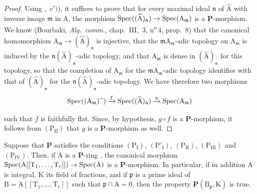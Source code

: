\begin{proof}
Using ,~$c')$), it suffices to prove that for every maximal ideal $\mathfrak{n}$ of $\widehat{\mathrm{A}}$ with inverse image $\mathfrak{m}$ in $\mathrm{A}$, the morphism $\operatorname{Spec}((\widehat{\mathrm{A}})_\mathfrak{n})\to\operatorname{Spec}(\mathrm{A}_\mathfrak{m})$ is a $\boldsymbol{P}$-morphism.
We know (Bourbaki, \emph{Alg.\ comm.}, chap.~III, \textsection\,3, n\textsuperscript{o}\,4, prop.~8) that the canonical homomorphism $\mathrm{A}_\mathfrak{m}\to(\widehat{\mathrm{A}})_\mathfrak{n}$ is injective, that the $\mathfrak{m}\mathrm{A}_\mathfrak{m}$-adic topology on $\mathrm{A}_\mathfrak{m}$ is induced by the $\mathfrak{n}(\widehat{\mathrm{A}})_\mathfrak{n}$-adic topology, and that $\mathrm{A}_\mathfrak{m}$ is dense in $(\widehat{\mathrm{A}})_\mathfrak{n}$ for this topology, so that the completion of $\mathrm{A}_\mathfrak{m}$ for the $\mathfrak{m}\mathrm{A}_\mathfrak{m}$-adic topology identifies with that of $(\widehat{\mathrm{A}})_\mathfrak{n}$ for the $\mathfrak{n}(\widehat{\mathrm{A}})_\mathfrak{n}$-adic topology.
We have therefore two morphisms
\[
  \operatorname{Spec}((\mathrm{A}_\mathfrak{m})\widehat{\phantom{x}})\xrightarrow{f}\operatorname{Spec}((\widehat{\mathrm{A}})_\mathfrak{n})\xrightarrow{g}\operatorname{Spec}(\mathrm{A}_\mathfrak{m})
\]


such that $f$ is faithfully flat. Since, by hypothesis, $g\circ f$ is a $\boldsymbol{P}$-morphism, it follows from $(\mathrm{P_{II}})$ that $g$ is a $\boldsymbol{P}$-morphism as well.
\end{proof}

\begin{corollary}[7.4.7]
\label{IV.7.4.7}
Suppose that $\boldsymbol{P}$ satisfies the conditions $(\mathrm{P_I})$, $(\mathrm{P}'_\mathrm{I})$, $(\mathrm{P_{II}})$, $(\mathrm{P_{III}})$ and $(\mathrm{P_{IV}})$.
Then, if $\mathrm{A}$ is a $\boldsymbol{P}$-ring , the canonical morphism $\operatorname{Spec}(\mathrm{A}[[\mathrm{T}_1,\ldots,\mathrm{T}_r]])\to\operatorname{Spec}(\mathrm{A})$ is a $\boldsymbol{P}$-morphism.
In particular, if in addition $\mathrm{A}$ is integral, $\mathrm{K}$ its field of fractions, and if $\mathfrak{p}$ is a prime ideal of $\mathrm{B}=\mathrm{A}[[\mathrm{T}_1,\ldots,\mathrm{T}_r]]$ such that $\mathfrak{p}\cap\mathrm{A}=0$, then the property $\boldsymbol{P}(\mathrm{B}_\mathfrak{p},\mathrm{K})$ is true.
\end{corollary}

